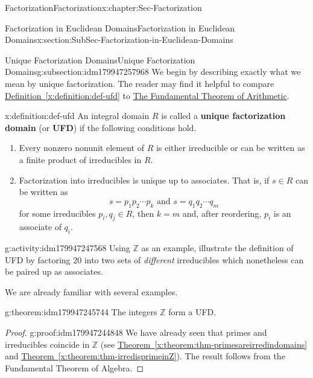 \documentclass[oneside,10pt,]{book}
\newcommand{\xreffont}{\relax}
\newcommand{\terminology}[1]{\textbf{#1}}
\numberwithin{equation}{section}
\def\Z{{\mathbb Z}}
\begin{document}
\begin{chapterptx}{Factorization}{}{Factorization}{}{}{x:chapter:Sec-Factorization}
\begin{sectionptx}{Factorization in Euclidean Domains}{}{Factorization in Euclidean Domains}{}{}{x:section:SubSec-Factorization-in-Euclidean-Domains}
\begin{introduction}{}
\end{introduction}%
%
%
\typeout{************************************************}
\typeout{************************************************}
%
\begin{subsectionptx}{Unique Factorization Domains}{}{Unique Factorization Domains}{}{}{g:subsection:idm179947257968}
We begin by describing exactly what we mean by unique factorization. The reader may find it helpful to compare \hyperref[x:definition:def-ufd]{Definition~{\xreffont\ref{x:definition:def-ufd}}} to \hyperref[x:assemblage:ftarith]{The Fundamental Theorem of Arithmetic}.%
\begin{definition}{}{x:definition:def-ufd}%
%
An integral domain \(R\) is called a \terminology{unique factorization domain} (or \terminology{UFD}) if the following conditions hold.%
\begin{enumerate}
\item{}Every nonzero nonunit element of \(R\) is either irreducible or can be written as a finite product of irreducibles in \(R\).%
\item{}Factorization into irreducibles is unique up to associates. That is, if \(s\in R\) can be written as%
\begin{equation*}
s = p_1 p_2 \cdots p_k \text{ and }  s = q_1 q_2 \cdots q_m
\end{equation*}
for some irreducibles \(p_i, q_j\in R\), then \(k=m\) and, after reordering, \(p_i\) is an associate of \(q_i\).%
\end{enumerate}
%
\end{definition}
\begin{activity}{}{g:activity:idm179947247568}%
Using \(\Z\) as an example, illustrate the definition of UFD by factoring 20 into two sets of \emph{different} irreducibles which nonetheless can be paired up as associates.%
\end{activity}
We are already familiar with several examples.%
\begin{theorem}{}{}{g:theorem:idm179947245744}%
The integers \(\Z\) form a UFD.%
\end{theorem}
\begin{proof}{}{g:proof:idm179947244848}
We have already seen that primes and irreducibles coincide in \(\Z\) (see \hyperref[x:theorem:thm-primesareirredindomains]{Theorem~{\xreffont\ref{x:theorem:thm-primesareirredindomains}}} and \hyperref[x:theorem:thm-irredisprimeinZ]{Theorem~{\xreffont\ref{x:theorem:thm-irredisprimeinZ}}}). The result follows from the Fundamental Theorem of Algebra.\end{proof}

\end{subsectionptx}
\end{sectionptx}
\end{chapterptx}
\end{document}

